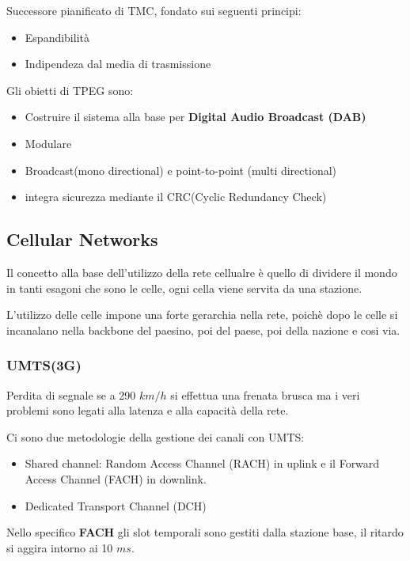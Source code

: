 Successore pianificato di TMC, fondato sui seguenti principi:
\begin{itemize}
	\item Espandibilità
	\item Indipendeza dal media di trasmissione
\end{itemize}


Gli obietti di TPEG sono:
\begin{itemize}
	\item Costruire il sistema alla base per \textbf{Digital Audio Broadcast (DAB)}
	\item Modulare
	\item Broadcast(mono directional) e point-to-point (multi directional)
	\item integra sicurezza mediante il CRC(Cyclic Redundancy Check)
\end{itemize}


\subsection{Cellular Networks}

Il concetto alla base dell'utilizzo della rete cellualre \`e quello di dividere il mondo in tanti
esagoni che sono le celle, ogni cella viene servita da una stazione.


L'utilizzo delle celle impone una forte gerarchia nella rete, poich\`e dopo le celle si incanalano
nella backbone del paesino, poi del paese, poi della nazione e cosi via.

\subsubsection{UMTS(3G)}

Perdita di segnale se a 290 $km/h$ si effettua una frenata brusca ma i veri problemi sono legati
alla latenza e alla capacità della rete.

Ci sono due metodologie della gestione dei canali con UMTS:
\begin{itemize}
	\item Shared channel: Random Access Channel (RACH) in uplink e il Forward Access Channel (FACH)
	      in downlink.
	\item Dedicated Transport Channel (DCH)
\end{itemize}


Nello specifico \textbf{FACH} gli slot temporali sono gestiti dalla stazione base, il ritardo si
aggira intorno ai 10 $ms$.

